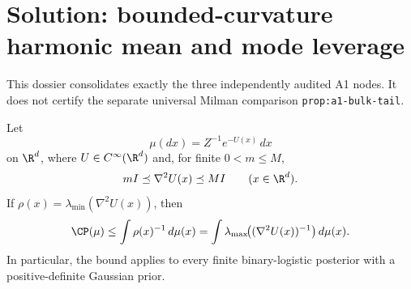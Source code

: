 \documentclass[../main.tex]{subfiles}
\begin{document}

\section*{Solution: bounded-curvature harmonic mean and mode leverage}
\label{sec:sol-a1-harmonic-mode-leverage}

This dossier consolidates exactly the three independently audited A1 nodes.  It does not certify
the separate universal Milman comparison \texttt{prop:a1-bulk-tail}.

\begin{theorem}
\label{thm:sol-a1-harmonic}
Let
\[
  \mu(dx)=Z^{-1}e^{-U(x)}\,dx
\]
on $\R^d$, where $U\in C^\infty(\R^d)$ and, for finite $0<m\le M$,
\[
  mI\preceq\nabla^2U(x)\preceq MI\qquad(x\in\R^d).
\]
If $\rho(x)=\lambda_{\min}(\nabla^2U(x))$, then
\[
  \CP(\mu)\le \int\rho(x)^{-1}\,d\mu(x)
  =\int\lambda_{\max}\!\big((\nabla^2U(x))^{-1}\big)\,d\mu(x).
\]
In particular, the bound applies to every finite binary-logistic posterior with a
positive-definite Gaussian prior.
\end{theorem}
\end{document}
